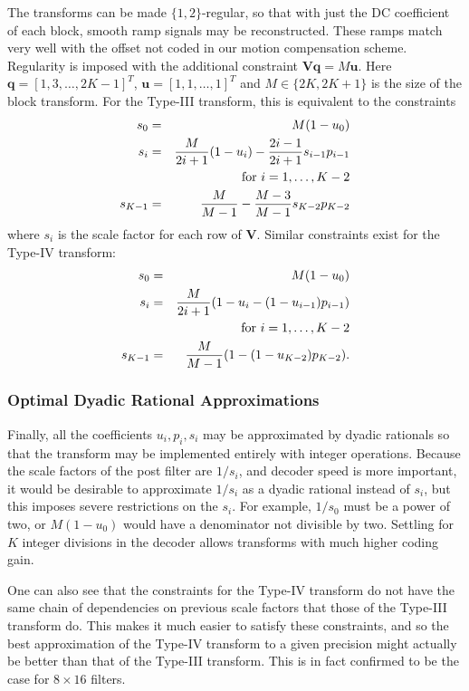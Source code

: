 \documentclass[11pt,letterpaper]{article}
\begin{document}
The transforms can be made $\{1,2\}$-regular, so that with just the DC
 coefficient of each block, smooth ramp signals may be reconstructed.
These ramps match very well with the offset not coded in our motion
 compensation scheme.
Regularity is imposed with the additional constraint
 ${\mathbf V}{\mathbf q}=M{\mathbf u}$.
Here ${\mathbf q}=[1,3,\ldots,2K-1]^T$, ${\mathbf u}=[1,1,\ldots,1]^T$ and
 $M\in\{2K,2K+1\}$ is the size of the block transform.
For the Type-III transform, this is equivalent to the constraints
\begin{eqnarray*}
s_0    &=&M(1-u_0)\\
s_i    &=&\frac{M}{2i+1}(1-u_i)-\frac{2i-1}{2i+1}s_{i-1}p_{i-1}\\
       & &{\rm \ for\ }i=1,\ldots,K-2\\
s_{K-1}&=&\frac{M}{M-1}-\frac{M-3}{M-1}s_{K-2}p_{K-2}
\end{eqnarray*}
 where $s_i$ is the scale factor for each row of ${\mathbf V}$.
Similar constraints exist for the Type-IV transform:
\begin{eqnarray*}
s_0    &=&M(1-u_0)\\
s_i    &=&\frac{M}{2i+1}(1-u_i-(1-u_{i-1})p_{i-1})\\
       & &{\rm \ for\ }i=1,\ldots,K-2\\
s_{K-1}&=&\frac{M}{M-1}(1-(1-u_{K-2})p_{K-2}).
\end{eqnarray*}

\subsubsection{Optimal Dyadic Rational Approximations}

Finally, all the coefficients $u_i,p_i,s_i$ may be approximated by dyadic
 rationals so that the transform may be implemented entirely with integer
 operations.
Because the scale factors of the post filter are $1/s_i$, and decoder speed is
 more important, it would be desirable to approximate $1/s_i$ as a dyadic
 rational instead of $s_i$, but this imposes severe restrictions on the $s_i$.
For example, $1/s_0$ must be a power of two, or $M(1-u_0)$ would have a
 denominator not divisible by two.
Settling for $K$ integer divisions in the decoder allows transforms with much
 higher coding gain.

One can also see that the constraints for the Type-IV transform do not have the
 same chain of dependencies on previous scale factors that those of the
 Type-III transform do.
This makes it much easier to satisfy these constraints, and so the best
 approximation of the Type-IV transform to a given precision might actually be
 better than that of the Type-III transform.
This is in fact confirmed to be the case for $8\times 16$ filters.
\end{document}
